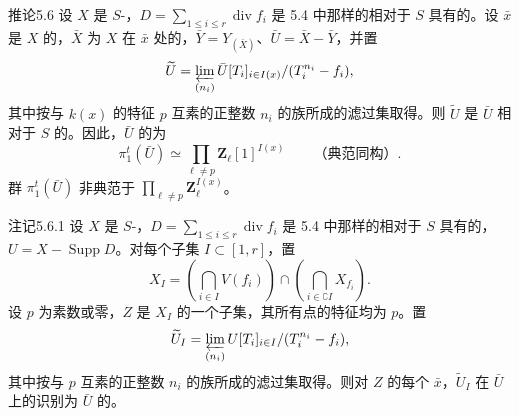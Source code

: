 \begin{SGAresult}{推论}{5.6}
设 $X$ 是 $S$-，$D=\sum_{1\leq i\leq r}\operatorname{div}f_i$ 是 5.4 中那样的相对于 $S$ 具有的。设 $\bar x$ 是 $X$ 的，$\bar X$ 为 $X$ 在 $\bar x$ 处的，$\bar Y=Y_{(\bar X)}$、$\bar U=\bar X-\bar Y$，并置
\[\widetilde U=\varprojlim_{(n_i)}\bar U[T_i]_{i\in I(x)}/(T_i^{n_i}-f_i),\]
其中按与 $k(x)$ 的特征 $p$ 互素的正整数 $n_i$ 的族所成的滤过集取得。则 $\widetilde U$ 是 $\bar U$ 相对于 $S$ 的。因此，$\bar U$ 的为
\[\pi_1^t(\bar U)\simeq\prod_{\ell\ne p}\mathbf Z_\ell[1]^{I(x)}\qquad\text{（典范同构）}.\]
群 $\pi_1^t(\bar U)$ 非典范于 $\prod_{\ell\ne p}\mathbf Z_\ell^{I(x)}$。
\end{SGAresult}

\begin{SGAresult}{注记}{5.6.1}
设 $X$ 是 $S$-，$D=\sum_{1\leq i\leq r}\operatorname{div}f_i$ 是 5.4 中那样的相对于 $S$ 具有的，$U=X-\operatorname{Supp}D$。对每个子集 $I\subset[1,r]$，置
\[X_I=\left(\bigcap_{i\in I}V(f_i)\right)\cap\left(\bigcap_{i\in\complement I}X_{f_i}\right).\]
设 $p$ 为素数或零，$Z$ 是 $X_I$ 的一个子集，其所有点的特征均为 $p$。置
\[\widetilde U_I=\varprojlim_{(n_i)}U[T_i]_{i\in I}/(T_i^{n_i}-f_i),\]
其中按与 $p$ 互素的正整数 $n_i$ 的族所成的滤过集取得。则对 $Z$ 的每个 $\bar x$，$\widetilde U_I$ 在 $\bar U$ 上的识别为 $\bar U$ 的。
\end{SGAresult}

